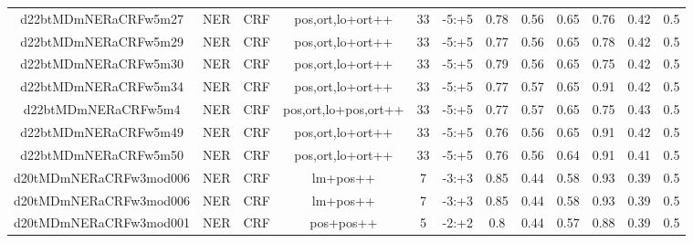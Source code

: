 \documentclass[a4paper]{article}
\begin{document}
\begin{landscape}
\begin{center}
\begin{tabular}{ |c|c|c|c|c|c|c|c|c|c|c|c|}
 	\small{ d22btMDmNERaCRFw5m27 } & \small{ NER} & \small{  CRF }  & pos,ort,lo+ort++  &  33 &  \small{  -5:+5 }  &  0.78 & 0.56 & 0.65  &  0.76 & 0.42 & 0.5 \\
 	

 
 	
 	\small{ d22btMDmNERaCRFw5m29 } & \small{ NER} & \small{  CRF }  & pos,ort,lo+ort++  &  33 &  \small{  -5:+5 }  &  0.77 & 0.56 & 0.65  &  0.78 & 0.42 & 0.5 \\
 	

 
 	
 	\small{ d22btMDmNERaCRFw5m30 } & \small{ NER} & \small{  CRF }  & pos,ort,lo+ort++  &  33 &  \small{  -5:+5 }  &  0.79 & 0.56 & 0.65  &  0.75 & 0.42 & 0.5 \\
 	

 
 	
 	\small{ d22btMDmNERaCRFw5m34 } & \small{ NER} & \small{  CRF }  & pos,ort,lo+ort++  &  33 &  \small{  -5:+5 }  &  0.77 & 0.57 & 0.65  &  0.91 & 0.42 & 0.5 \\
 	

 
 	
 	\small{ d22btMDmNERaCRFw5m4 } & \small{ NER} & \small{  CRF }  & pos,ort,lo+pos,ort++  &  33 &  \small{  -5:+5 }  &  0.77 & 0.57 & 0.65  &  0.75 & 0.43 & 0.5 \\
 	

 
 	
 	\small{ d22btMDmNERaCRFw5m49 } & \small{ NER} & \small{  CRF }  & pos,ort,lo+ort++  &  33 &  \small{  -5:+5 }  &  0.76 & 0.56 & 0.65  &  0.91 & 0.42 & 0.5 \\
 	

 
 	
 	\small{ d22btMDmNERaCRFw5m50 } & \small{ NER} & \small{  CRF }  & pos,ort,lo+ort++  &  33 &  \small{  -5:+5 }  &  0.76 & 0.56 & 0.64  &  0.91 & 0.41 & 0.5 \\
 	

 
 	
 	\small{ d20tMDmNERaCRFw3mod006 } & \small{ NER} & \small{  CRF }  & lm+pos++  &  7 &  \small{  -3:+3 }  &  0.85 & 0.44 & 0.58  &  0.93 & 0.39 & 0.5 \\
 	

 
 	
 	\small{ d20tMDmNERaCRFw3mod006 } & \small{ NER} & \small{  CRF }  & lm+pos++  &  7 &  \small{  -3:+3 }  &  0.85 & 0.44 & 0.58  &  0.93 & 0.39 & 0.5 \\
 	

 
 	
 	\small{ d20tMDmNERaCRFw3mod001 } & \small{ NER} & \small{  CRF }  & pos+pos++  &  5 &  \small{  -2:+2 }  &  0.8 & 0.44 & 0.57  &  0.88 & 0.39 & 0.5 \\
 	


\end{tabular}
\end{center}
\end{landscape}
\end{document}
